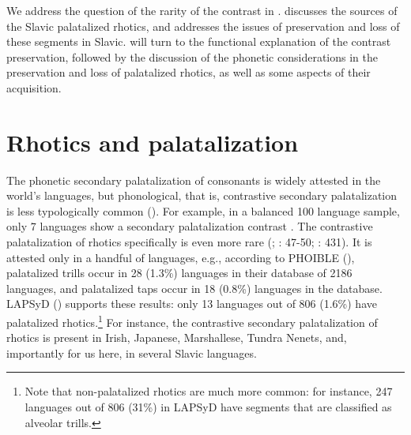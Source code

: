 \documentclass[output=paper]{langscibook}
\begin{document}
We address the question of the rarity of the contrast in .  discusses the sources of the Slavic palatalized rhotics, and  addresses the issues of preservation and loss of these segments in Slavic.  will turn to the functional explanation of the contrast preservation, followed by the discussion of the phonetic considerations in the preservation and loss of palatalized rhotics, as well as some aspects of their acquisition.

\section{Rhotics and palatalization}
\label{sec:kavitskaya:2}
The phonetic secondary palatalization of consonants is widely attested in the world’s languages, but phonological, that is, contrastive secondary palatalization is less typologically common (\citealt{Bhat1978,Stadnik2002,Bateman2011,KrämerUrek2016}). For example, in a balanced 100 language sample, only 7 languages show a secondary palatalization contrast \citep{Easterday2017}. The contrastive palatalization of rhotics specifically is even more rare (\citealt{Hall2000,Żygis2005}; \citealt{Jaworski2018}: 47-50; \citealt{NikolaevGrossman2020}: 431). It is attested only in a handful of languages, e.g., according to PHOIBLE (\citealt{MoranMcCloy2019}), palatalized trills occur in 28 (1.3\%) languages in their database of 2186 languages, and palatalized taps occur in 18 (0.8\%) languages in the database. LAPSyD (\citealt{MaddiesonEtAl2016}) supports these results: only 13 languages out of 806 (1.6\%) have palatalized rhotics.\footnote{Note that non-palatalized rhotics are much more common: for instance, 247 languages out of 806 (31\%) in LAPSyD have segments that are classified as alveolar trills.} For instance, the contrastive secondary palatalization of rhotics is present in Irish, Japanese, Marshallese, Tundra Nenets, and, importantly for us here, in several Slavic languages.
\end{document}
